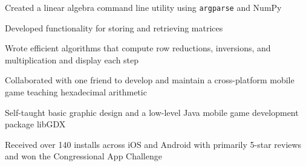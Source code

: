 \documentclass[]{deedy-resume-openfont}
\begin{document}
\begin{minipage}[t]{0.66\textwidth}
\begin{tightemize}
\item Created a linear algebra command line utility using \texttt{argparse} and NumPy
\item Developed functionality for storing and retrieving matrices
\item Wrote efficient algorithms that compute row reductions, inversions, and multiplication and display each step
\end{tightemize}

\begin{tightemize}
\item Collaborated with one friend to develop and maintain a cross-platform mobile game teaching hexadecimal arithmetic
\item Self-taught basic graphic design and a low-level Java mobile game development package libGDX
\item Received over 140 installs across iOS and Android with primarily 5-star reviews and won the Congressional App Challenge
\end{tightemize}

\end{minipage} 
\end{document}
